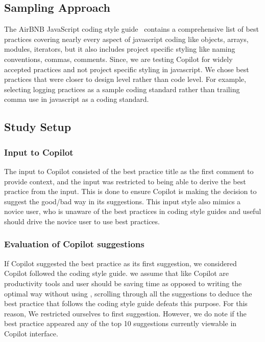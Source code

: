 \subsection{Sampling Approach}
\label{smells:sampling}
The AirBNB JavaScript coding style guide~\cite{airbnb_code} contains a comprehensive list of best practices covering nearly every aspect of javascript coding like objects, arrays, modules, iterators, but it also includes project specific styling like naming conventions, commas, comments.
Since, we are testing Copilot for widely accepted practices and not project specific styling in javascript. We chose best practices that were closer to design level rather than code level. For example, selecting logging practices as a sample coding standard rather than trailing comma use in javascript as a coding standard.

\subsection{Study Setup}

\subsubsection{Input to Copilot}
\label{smells:input}
The input to Copilot consisted of the best practice title as the first comment to provide context, and the input was restricted to being able to derive the best practice from the input. This is done to ensure Copilot is making the decision to suggest the good/bad way in its suggestions. This input style also mimics a novice user, who is unaware of the best practices in coding style guides and useful \cct{} should drive the novice user to use best practices.

\subsubsection{Evaluation of Copilot suggestions}
\label{smells:evaluation}
If Copilot suggested the best practice as its first suggestion, we considered Copilot followed the coding style guide. we assume that \cct{} like Copilot are productivity tools and user should be saving time as opposed to writing the optimal way without using \cct{}, scrolling through all the suggestions to deduce the best practice that follows the coding style guide defeats this purpose. 
For this reason, We restricted ourselves to first suggestion. However, we do note if the best practice appeared any of the top 10 suggestions currently viewable in Copilot interface. 


